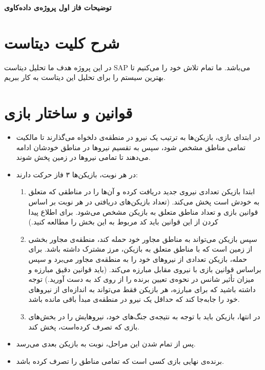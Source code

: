 \documentclass{article}
\begin{document}
    \begin{center}
        \huge\textbf{توضیحات فاز اول پروژه‌ی داده‌کاوی}
	\end{center}

    \begin{large}
        \section{شرح کلیت دیتاست}
            در این پروژه هدف ما تحلیل دیتاست SAP می‌باشد.
            ما تمام تلاش خود را می‌کنیم تا بهترین سیستم را برای تحلیل این دیتاست به کار ببریم.

\section{ قوانین و ساختار بازی}

    \begin{itemize}
        \item در ابتدای بازی، بازیکن‌ها به ترتیب یک نیرو در منطقه‌ی دلخواه می‌گذارند تا مالکیت تمامی مناطق مشخص شود، سپس به تقسیم نیروها در مناطق خودشان ادامه می‌دهند تا تمامی نیروها در زمین پخش شوند.
        \item در هر نوبت، بازیکن‌ها ۳ فاز حرکت دارند:
        \begin{enumerate}
            \item ابتدا بازیکن تعدادی نیروی جدید دریافت کرده و آن‌ها را در مناطقی که متعلق به خودش است پخش می‌کند. (تعداد بازیکن‌های دریافتی در هر نوبت بر اساس قوانین بازی و تعداد مناطق متعلق به بازیکن مشخص می‌شود. برای اطلاع پیدا کردن از این قوانین باید کد مربوط به این بخش را مطالعه کنید.)
            \item سپس بازیکن می‌تواند به مناطق مجاور خود حمله کند، منطقه‌ی مجاور بخشی از زمین است که با مناطق متعلق به بازیکن، مرز مشترک داشته باشد. برای حمله، بازیکن تعدادی از نیروهای خود را به منطقه‌ی مجاور می‌برد و سپس براساس قوانین بازی با نیروی مقابل مبارزه می‌کند. (باید قوانین دقیق مبارزه و میزان تأثیر شانس در نحوه‌ی تعیین برنده را از روی کد به دست آورید.) توجه داشته باشید که برای مبارزه، هر بازیکن فقط می‌تواند به اندازه‌ای از نیروهای خود را جابه‌جا کند که حداقل یک نیرو در منطقه‌ی مبدأ باقی مانده باشد.
            \item در انتها، بازیکن باید با توجه به نتیجه‌ی جنگ‌های خود، نیروهایش را در بخش‌های بازی که تصرف کرده‌است، پخش کند.
        \end{enumerate}
        \item پس از تمام شدن این مراحل، نوبت به بازیکن بعدی می‌رسد.
        \item برنده‌ی نهایی بازی کسی است که تمامی مناطق را تصرف کرده باشد.
    \end{itemize}

\end{large}
\end{document}
